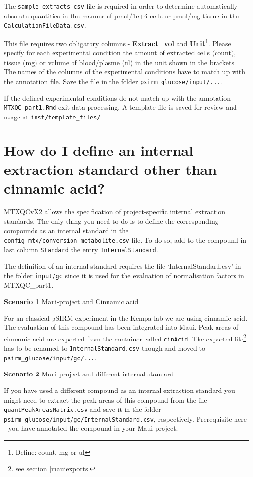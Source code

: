 \documentclass[]{book}
\let\rmarkdownfootnote\footnote%
\def\footnote{\protect\rmarkdownfootnote}
\theoremstyle{definition}
\theoremstyle{definition}
\theoremstyle{definition}
\theoremstyle{remark}
\begin{document}
The \texttt{sample\_extracts.csv} file is required in order to determine
automatically absolute quantities in the manner of pmol/1e+6 cells or
pmol/mg tissue in the \texttt{CalculationFileData.csv}.

This file requires two obligatory columns - \textbf{Extract\_vol} and
\textbf{Unit}\footnote{Define: count, mg or ul}. Please specify for each
experimental condition the amount of extracted cells (count), tissue
(mg) or volume of blood/plasme (ul) in the unit shown in the brackets.\\
The names of the columns of the experimental conditions have to match up
with the annotation file. Save the file in the folder
\texttt{psirm\_glucose/input/...}.

If the defined experimental conditions do not match up with the
annotation \texttt{MTXQC\_part1.Rmd} exit data processing. A template
file is saved for review and usage at \texttt{inst/template\_files/...}

\section{How do I define an internal extraction standard other than
cinnamic acid?}\label{definternal}

MTXQCvX2 allows the specification of project-specific internal
extraction standards. The only thing you need to do is to define the
corresponding compounds as an internal standard in the
\texttt{config\_mtx/conversion\_metabolite.csv} file. To do so, add to
the compound in last column \texttt{Standard} the entry
\texttt{InternalStandard}.

The definition of an internal standard requires the file
`InternalStandard.csv' in the folder \texttt{input/gc} since it is used
for the evaluation of normalisation factors in MTXQC\_part1.

\textbf{Scenario 1} Maui-project and Cinnamic acid

For an classical pSIRM experiment in the Kempa lab we are using cinnamic
acid. The evaluation of this compound has been integrated into Maui.
Peak areas of cinnamic acid are exported from the container called
\texttt{cinAcid}. The exported file\footnote{see section
  \ref{mauiexports}} has to be renamed to \texttt{InternalStandard.csv}
though and moved to \texttt{psirm\_glucose/input/gc/...}.

\textbf{Scenario 2} Maui-project and different internal standard

If you have used a different compound as an internal extraction standard
you might need to extract the peak areas of this compound from the file
\texttt{quantPeakAreasMatrix.csv} and save it in the folder
\texttt{psirm\_glucose/input/gc/InternalStandard.csv}, respectively.
Prerequisite here - you have annotated the compound in your
Maui-project.
\end{document}
